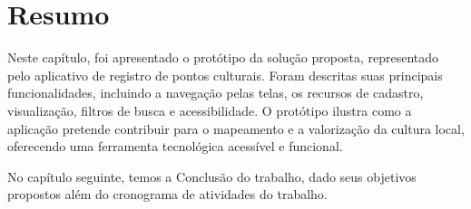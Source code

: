 \section*{Resumo} \label{sec:ajudaai:resumo}
Neste capítulo, foi apresentado o protótipo da solução proposta, representado pelo aplicativo de registro de pontos culturais. Foram descritas suas principais funcionalidades, incluindo a navegação pelas telas, os recursos de cadastro, visualização, filtros de busca e acessibilidade. O protótipo ilustra como a aplicação pretende contribuir para o mapeamento e a valorização da cultura local, oferecendo uma ferramenta tecnológica acessível e funcional.

No capítulo seguinte, temos a Conclusão do trabalho, dado seus objetivos propostos além do cronograma de atividades do trabalho.